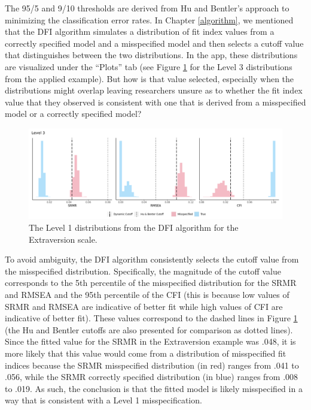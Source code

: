 \documentclass[
]{book}
\begin{document}
The 95/5 and 9/10 thresholds are derived from Hu and Bentler's approach to minimizing the classification error rates. In Chapter \ref{algorithm}, we mentioned that the DFI algorithm simulates a distribution of fit index values from a correctly specified model and a misspecified model and then selects a cutoff value that distinguishes between the two distributions. In the app, these distributions are visualized under the ``Plots'' tab (see Figure \ref{fig:one-graph} for the Level 3 distributions from the applied example). But how is that value selected, especially when the distributions might overlap leaving researchers unsure as to whether the fit index value that they observed is consistent with one that is derived from a misspecified model or a correctly specified model?

\begin{figure}

{\centering \includegraphics[width=1\linewidth]{one-graph} 

}

\caption{The Level 1 distributions from the DFI algorithm for the Extraversion scale.}\label{fig:one-graph}
\end{figure}

To avoid ambiguity, the DFI algorithm consistently selects the cutoff value from the misspecified distribution. Specifically, the magnitude of the cutoff value corresponds to the 5th percentile of the misspecified distribution for the SRMR and RMSEA and the 95th percentile of the CFI (this is because low values of SRMR and RMSEA are indicative of better fit while high values of CFI are indicative of better fit). These values correspond to the dashed lines in Figure \ref{fig:one-graph} (the Hu and Bentler cutoffs are also presented for comparison as dotted lines). Since the fitted value for the SRMR in the Extraversion example was .048, it is more likely that this value would come from a distribution of misspecified fit indices because the SRMR misspecified distribution (in red) ranges from .041 to .056, while the SRMR correctly specified distribution (in blue) ranges from .008 to .019. As such, the conclusion is that the fitted model is likely misspecified in a way that is consistent with a Level 1 misspecification.
\end{document}
